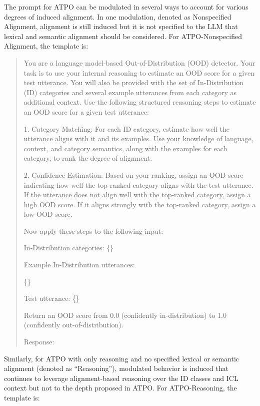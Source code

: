 The prompt for ATPO can be modulated in several ways to account for various degrees of induced alignment. In one modulation, denoted as Nonspecified Alignment, alignment is still induced but it is not specified to the LLM that lexical and semantic alignment should be considered.
For ATPO-Nonspecified Alignment, the template is:
\begin{quote}
You are a language model-based Out-of-Distribution (OOD) detector. Your task is to use your internal reasoning to estimate an OOD score for a given test utterance. You will also be provided with the set of In-Distribution (ID) categories and several example utterances from each category as additional context. Use the following structured reasoning steps to estimate an OOD score for a given test utterance:

1. Category Matching: For each ID category, estimate how well the utterance aligns with it and its examples. Use your knowledge of language, context, and category semantics, along with the examples for each category, to rank the degree of alignment.

2. Confidence Estimation: Based on your ranking, assign an OOD score indicating how well the top-ranked category aligns with the test utterance. If the utterance does not align well with the top-ranked category, assign a high OOD score. If it aligns strongly with the top-ranked category, assign a low OOD score.

Now apply these steps to the following input:

In-Distribution categories: \{\}

Example In-Distribution utterances:

\{\}

Test utterance: \{\}

Return an OOD score from 0.0 (confidently in-distribution) to 1.0 (confidently out-of-distribution).

Response:
\end{quote}
Similarly, for ATPO with only reasoning and no specified lexical or semantic alignment (denoted as ``Reasoning''), modulated behavior is induced that continues to leverage alignment-based reasoning over the ID classes and ICL context but not to the depth proposed in ATPO.
For ATPO-Reasoning, the template is:
